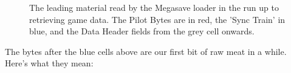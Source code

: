\begin{figure}[H]
{\begin{adjustbox}{width=10cm,center}
    \end{adjustbox}
  }\caption{The leading material read by the Megasave loader in the run up to retrieving game data. The Pilot Bytes are in red, 
the 'Sync Train' in blue, and the Data Header fields from the grey cell onwards.}
\end{figure}

The bytes after the blue cells above are our first bit of raw meat in a while. Here's what they mean:

